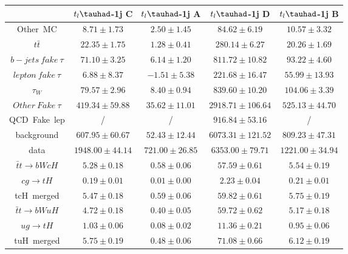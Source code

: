 \centering
\begin{tabular}{|c|c|c|c|c|} \hline
 & $t_{l}\tauhad$-1j C & $t_{l}\tauhad$-1j A & $t_{l}\tauhad$-1j D & $t_{l}\tauhad$-1j B\\\hline
Other~MC & $8.71\pm1.73$ & $2.50\pm1.45$ & $84.62\pm6.19$ & $10.57\pm3.32$\\\hline
$t\bar{t}$ & $22.35\pm1.75$ & $1.28\pm0.41$ & $280.14\pm6.27$ & $20.26\pm1.69$\\\hline
$b-jets~fake~\tau$ & $71.10\pm3.25$ & $6.14\pm1.20$ & $811.72\pm10.82$ & $93.22\pm4.60$\\\hline
$lepton~fake~\tau$ & $6.88\pm8.37$ & $-1.51\pm5.38$ & $221.68\pm16.47$ & $55.99\pm13.93$\\\hline
$\tau_{W}$ & $79.57\pm2.96$ & $8.40\pm0.94$ & $839.60\pm10.20$ & $104.06\pm3.39$\\\hline
$Other~Fake~\tau$ & $419.34\pm59.88$ & $35.62\pm11.01$ & $2918.71\pm106.64$ & $525.13\pm44.70$\\\hline
QCD~Fake~lep &  / &  / & $916.84\pm53.16$ &  /\\\hline
background & $607.95\pm60.67$ & $52.43\pm12.44$ & $6073.31\pm121.52$ & $809.23\pm47.31$\\\hline
data & $1948.00\pm44.14$ & $721.00\pm26.85$ & $6353.00\pm79.71$ & $1221.00\pm34.94$\\\hline
$\bar{t}t\to bWcH$ & $5.28\pm0.18$ & $0.58\pm0.06$ & $57.59\pm0.61$ & $5.54\pm0.19$\\\hline
$cg\to tH$ & $0.19\pm0.01$ & $0.01\pm0.00$ & $2.23\pm0.04$ & $0.21\pm0.01$\\\hline
tcH~merged & $5.47\pm0.18$ & $0.59\pm0.06$ & $59.82\pm0.61$ & $5.75\pm0.19$\\\hline
$\bar{t}t\to bWuH$ & $4.72\pm0.18$ & $0.40\pm0.05$ & $59.72\pm0.62$ & $5.17\pm0.18$\\\hline
$ug\to tH$ & $1.03\pm0.06$ & $0.08\pm0.02$ & $11.36\pm0.21$ & $0.95\pm0.06$\\\hline
tuH~merged & $5.75\pm0.19$ & $0.48\pm0.06$ & $71.08\pm0.66$ & $6.12\pm0.19$\\\hline
\end{tabular}
